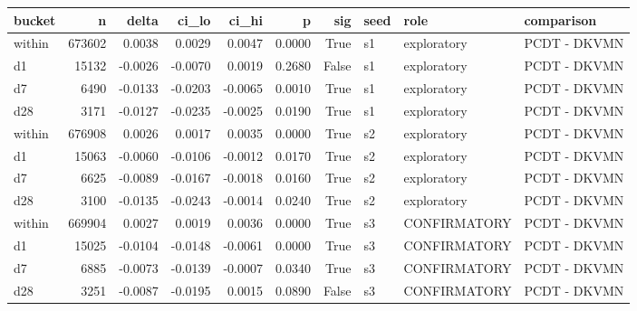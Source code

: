 \begin{tabular}{lrrrrrrlll}
\toprule
bucket & n & delta & ci\_lo & ci\_hi & p & sig & seed & role & comparison \\
\midrule
within & 673602 & 0.0038 & 0.0029 & 0.0047 & 0.0000 & True & s1 & exploratory & PCDT - DKVMN \\
d1 & 15132 & -0.0026 & -0.0070 & 0.0019 & 0.2680 & False & s1 & exploratory & PCDT - DKVMN \\
d7 & 6490 & -0.0133 & -0.0203 & -0.0065 & 0.0010 & True & s1 & exploratory & PCDT - DKVMN \\
d28 & 3171 & -0.0127 & -0.0235 & -0.0025 & 0.0190 & True & s1 & exploratory & PCDT - DKVMN \\
within & 676908 & 0.0026 & 0.0017 & 0.0035 & 0.0000 & True & s2 & exploratory & PCDT - DKVMN \\
d1 & 15063 & -0.0060 & -0.0106 & -0.0012 & 0.0170 & True & s2 & exploratory & PCDT - DKVMN \\
d7 & 6625 & -0.0089 & -0.0167 & -0.0018 & 0.0160 & True & s2 & exploratory & PCDT - DKVMN \\
d28 & 3100 & -0.0135 & -0.0243 & -0.0014 & 0.0240 & True & s2 & exploratory & PCDT - DKVMN \\
within & 669904 & 0.0027 & 0.0019 & 0.0036 & 0.0000 & True & s3 & CONFIRMATORY & PCDT - DKVMN \\
d1 & 15025 & -0.0104 & -0.0148 & -0.0061 & 0.0000 & True & s3 & CONFIRMATORY & PCDT - DKVMN \\
d7 & 6885 & -0.0073 & -0.0139 & -0.0007 & 0.0340 & True & s3 & CONFIRMATORY & PCDT - DKVMN \\
d28 & 3251 & -0.0087 & -0.0195 & 0.0015 & 0.0890 & False & s3 & CONFIRMATORY & PCDT - DKVMN \\
\bottomrule
\end{tabular}
